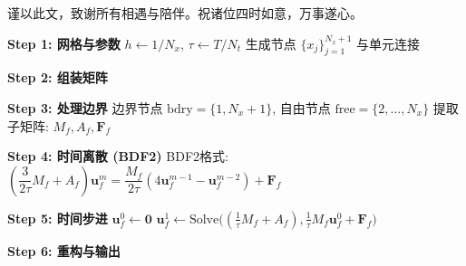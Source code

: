 \documentclass{GZUbachelorthesis}
\theoremstyle{chineseplain}
\begin{document}
谨以此文，致谢所有相遇与陪伴。祝诸位四时如意，万事遂心。


\appendix %
\begin{algorithm}
	\caption{BDF2-P1格式数值求解一维情形}
	\label{alg:BDF2-P1}
	\BlankLine
	\textbf{Step 1: 网格与参数}\;
	$h \gets 1/N_x$, $\tau \gets T/N_t$\;
	生成节点 $\{x_j\}_{j=1}^{N_x+1}$ 与单元连接\;
	
	\BlankLine
	\textbf{Step 2: 组装矩阵}\;
	
	\BlankLine
	\textbf{Step 3: 处理边界}\;
	边界节点 $\text{bdry}=\{1,N_x+1\}$, 自由节点 $\text{free}=\{2,\dots,N_x\}$\;
	提取子矩阵: $M_f, A_f, \mathbf{F}_f$\;
	
	\BlankLine
	\textbf{Step 4: 时间离散 (BDF2)}\;
	BDF2格式: $\left(\dfrac{3}{2\tau}M_f + A_f\right)\mathbf{u}_f^m = \dfrac{M_f}{2\tau}(4\mathbf{u}_f^{m-1} - \mathbf{u}_f^{m-2}) + \mathbf{F}_f$\;
	
	\BlankLine
	\textbf{Step 5: 时间步进}\;
	$\mathbf{u}_f^0 \gets \mathbf{0}$\;
	$\mathbf{u}_f^1 \gets \text{Solve}\big((\frac{1}{\tau}M_f + A_f), \frac{1}{\tau}M_f\mathbf{u}_f^0 + \mathbf{F}_f\big)$ 
	
	\BlankLine
	\textbf{Step 6: 重构与输出}\;
	\;
\end{algorithm}
\clearpage %
\end{document}
